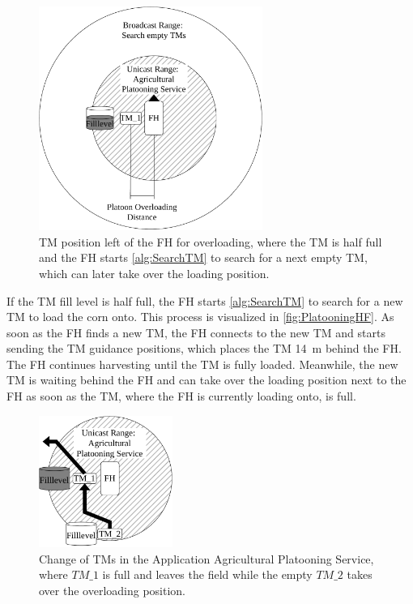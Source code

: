 \begin{figure}[]%
	\centering
	\includegraphics[width=0.65\textwidth]{Latex/figures/platoonHALF}
	\caption{\acf{TM} position left of the \acf{FH} for overloading, where the \ac{TM} is half full and the
		\ac{FH} starts \autoref{alg:SearchTM} to search for a next empty \ac{TM},
		which can later take over the loading position.}
	\label{fig:PlatooningHF}%
\end{figure}
If the \ac{TM} fill level is half full, the \ac{FH} starts \autoref{alg:SearchTM}
to search for a new \ac{TM} to load the corn onto.
This process is visualized in \autoref{fig:PlatooningHF}.
As soon as the \ac{FH} finds a new \ac{TM}, the \ac{FH} connects to the new \ac{TM} and starts sending
the \ac{TM} guidance positions, which places the \ac{TM} \SI{14}{\metre} behind the \ac{FH}.
The \ac{FH} continues harvesting until the \ac{TM} is fully loaded.
Meanwhile, the new \ac{TM} is waiting behind the \ac{FH} and can take over the loading position next to the \ac{FH} as
soon as the \ac{TM}, where the \ac{FH} is currently loading onto, is full.

\begin{figure}[]%
	\centering
	\includegraphics[width=0.39\textwidth]{Latex/figures/platoonFULL}
	\caption{Change of \acfp{TM} in the Application Agricultural Platooning Service, where $TM\_1$
	is full and leaves the field while the empty $TM\_2$ takes over the overloading position.}
	\label{fig:PlatooningFull}%
\end{figure}

